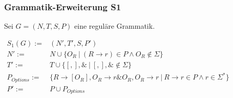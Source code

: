 \documentclass[]{article}
\begin{document}
% 

% 


% 
%     

\subsubsection*{Grammatik-Erweiterung S1}


Sei $G = (N,T,S,P)$ eine reguläre Grammatik.

$
\begin{array}{rl}
  S_1(G) :=& (N', T', S, P') \\
  N' :=& N \cup \{ O_R\ |\ (R\rightarrow r)\in P\land O_R \notin \Sigma\}\\
  T' :=& T \cup \{[ , ], \&\ |\ [,],\&\notin \Sigma \}\\
  P_{Options} :=& \{R \rightarrow [O_R], O_R \rightarrow r\& O_R, O_R \rightarrow r \ \vert\ R\rightarrow r\in P \land r\in \Sigma^*\} \\
  P' :=& P \cup P_{Options} 
\end{array}
$
\end{document}
